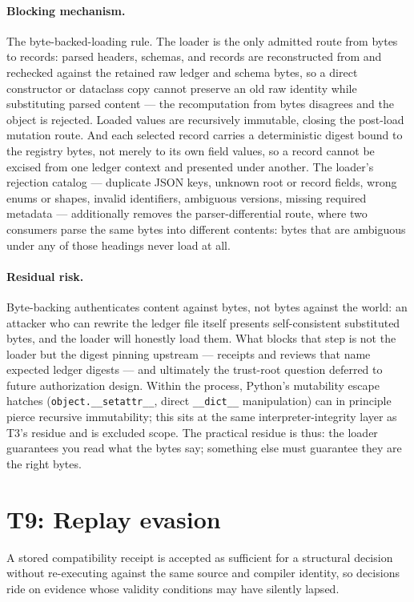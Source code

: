 \paragraph{Blocking mechanism.} The byte-backed-loading rule. The loader is the only admitted route from bytes to records: parsed headers, schemas, and records are reconstructed from and rechecked against the retained raw ledger and schema bytes, so a direct constructor or dataclass copy cannot preserve an old raw identity while substituting parsed content --- the recomputation from bytes disagrees and the object is rejected. Loaded values are recursively immutable, closing the post-load mutation route. And each selected record carries a deterministic digest bound to the registry bytes, not merely to its own field values, so a record cannot be excised from one ledger context and presented under another. The loader's rejection catalog --- duplicate JSON keys, unknown root or record fields, wrong enums or shapes, invalid identifiers, ambiguous versions, missing required metadata --- additionally removes the parser-differential route, where two consumers parse the same bytes into different contents: bytes that are ambiguous under any of those headings never load at all.

\paragraph{Residual risk.} Byte-backing authenticates content against bytes, not bytes against the world: an attacker who can rewrite the ledger file itself presents self-consistent substituted bytes, and the loader will honestly load them. What blocks that step is not the loader but the digest pinning upstream --- receipts and reviews that name expected ledger digests --- and ultimately the trust-root question deferred to future authorization design. Within the process, Python's mutability escape hatches (\texttt{object.\_\_setattr\_\_}, direct \texttt{\_\_dict\_\_} manipulation) can in principle pierce recursive immutability; this sits at the same interpreter-integrity layer as T3's residue and is excluded scope. The practical residue is thus: the loader guarantees you read what the bytes say; something else must guarantee they are the right bytes.

\section{T9: Replay evasion}\label{threat:t9}

\begin{threat}\label{threat:thr:replay}
A stored compatibility receipt is accepted as sufficient for a structural decision without re-executing against the same source and compiler identity, so decisions ride on evidence whose validity conditions may have silently lapsed.
\end{threat}

